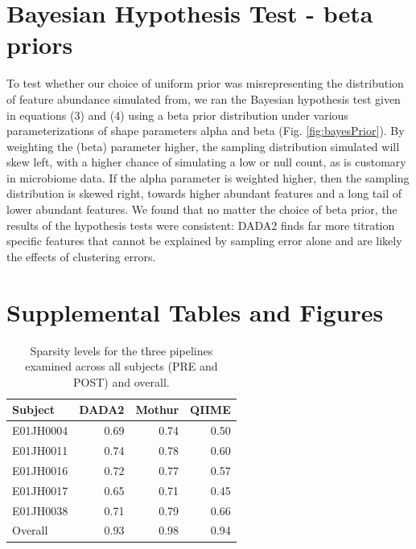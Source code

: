 \documentclass[12pt]{article}
\begin{document}
\section*{Bayesian Hypothesis Test - beta priors}
To test whether our choice of uniform prior was misrepresenting the distribution of feature abundance simulated from, we ran the Bayesian hypothesis test given in equations (3) and (4) using a beta prior distribution under various parameterizations of shape parameters alpha and beta (Fig. \ref{fig:bayesPrior}). By weighting the (beta) parameter higher, the sampling distribution simulated will skew left, with a higher chance of simulating a low or null count, as is customary in microbiome data. If the alpha parameter is weighted higher, then the sampling distribution is skewed right, towards higher abundant features and a long tail of lower abundant features. We found that no matter the choice of beta prior, the results of the hypothesis tests were consistent: DADA2 finds far more titration specific features that cannot be explained by sampling error alone and are likely the effects of clustering errors.

\cleardoublepage


 

\cleardoublepage

\section*{Supplemental Tables and Figures}
\clearpage

\begin{table}
\caption{\label{tab:sparsity}Sparsity levels for the three pipelines examined across all subjects (PRE and POST) and overall.}
\centering
\begin{tabular}[t]{lrrr}
\toprule
Subject   & DADA2 & Mothur & QIIME \\
\midrule
E01JH0004 & 0.69  & 0.74   & 0.50  \\
E01JH0011 & 0.74  & 0.78   & 0.60  \\
E01JH0016 & 0.72  & 0.77   & 0.57  \\
E01JH0017 & 0.65  & 0.71   & 0.45  \\
E01JH0038 & 0.71  & 0.79   & 0.66  \\
\midrule
Overall   & 0.93  & 0.98   & 0.94  \\
\bottomrule
\end{tabular}
\end{table}
\end{document}
